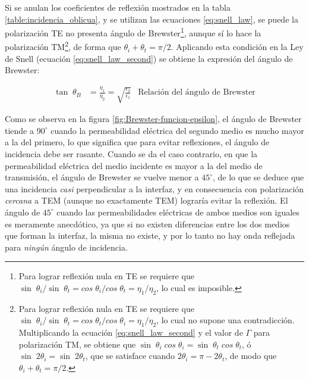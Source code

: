 Si se anulan los coeficientes de reflexión mostrados en la tabla \ref{table:incidencia_oblicua}, y se utilizan las ecuaciones \ref{eq:snell_law}, se puede la polarización TE no presenta ángulo de Brewster\footnote{Para lograr reflexión nula en TE se requiere que $\sin \; \theta_i / \sin \; \theta_t = cos \; \theta_i / cos \; \theta_t = \eta_1 / \eta_2$, lo cual es imposible.}, aunque sí lo hace la polarización TM\footnote{Para lograr reflexión nula en TE se requiere que $\sin \; \theta_i / \sin \; \theta_t = cos \; \theta_t / cos \; \theta_i = \eta_1 / \eta_2$, lo cual no supone una contradicción. Multiplicando la ecuación \ref{eq:snell_law_second} y el valor de $\Gamma$ para polarización TM, se obtiene que $\sin\;\theta_i \; cos \; \theta_i = \sin \; \theta_t \; cos \; \theta_t$, ó $\sin \; 2\theta_i = \sin \; 2\theta_t$, que se satisface cuando $2\theta_i = \pi - 2\theta_t$, de modo que $\theta_i + \theta_t = \pi/2$.}, de forma que $\theta_i + \theta_t = \pi/2$. Aplicando esta condición en la Ley de Snell (ecuación \ref{eq:snell_law_second}) se obtiene la expresión del ángulo de Brewster:


\begin{align}
	\label{eq:Brewster_angle}
	\tan\;\theta_B &= \frac{\eta_1}{\eta_2} = \sqrt{\frac{\epsilon_2}{\epsilon_1}} & \text{Relación del ángulo de Brewster}
\end{align}

Como se observa en la figura \ref{fig:Brewster-funcion-epsilon}, el ángulo de Brewster tiende a $90^{\circ}$ cuando la permeabilidad eléctrica del segundo medio es mucho mayor a la del primero, lo que significa que para evitar reflexiones, el ángulo de incidencia debe ser rasante. Cuando se da el caso contrario, en que la permeabilidad eléctrica del medio incidente es mayor a la del medio de transmisión, el ángulo de Brewster se vuelve menor a $45^{\circ}$, de lo que se deduce que una incidencia \textit{casi} perpendicular a la interfaz, y en consecuencia con polarización \textit{cercana} a TEM (aunque no exactamente TEM) lograría evitar la reflexión. El ángulo de $45^{\circ}$ cuando las permeabilidades eléctricas de ambos medios son iguales es meramente anecdótico, ya que si no existen diferencias entre los dos medios que forman la interfaz, la misma no existe, y por lo tanto no hay onda reflejada para \textit{ningún} ángulo de incidencia.

